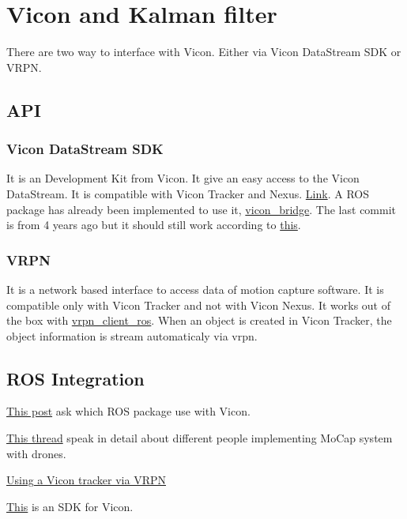 \section{Vicon and Kalman filter}
There are two way to interface with Vicon. Either via Vicon DataStream SDK or VRPN.

\subsection{API}
\subsubsection{Vicon DataStream SDK}
It is an Development Kit from Vicon. It give an easy access to the Vicon DataStream. It is compatible with Vicon Tracker and Nexus. \href{https://www.vicon.com/downloads/utilities-and-sdk/datastream-sdk}{Link}. A ROS package has already been implemented to use it, \href{https://github.com/ethz-asl/vicon_bridge}{vicon\_bridge}.
The last commit is from 4 years ago but it should still work according to \href{https://answers.ros.org/question/329849/which-ros-package-use-with-vicon/}{this}.

\subsubsection{VRPN}
It is a network based interface to access data of motion capture software. It is compatible only with Vicon Tracker and not with Vicon Nexus. It works out of the box with \href{https://wiki.ros.org/vrpn_client_ros}{vrpn\_client\_ros}. When an object is created in Vicon Tracker, the object information is stream automaticaly via vrpn.

\subsection{ROS Integration}
\href{https://answers.ros.org/question/329849/which-ros-package-use-with-vicon/}{This post} ask which ROS package use with Vicon.

\href{https://discuss.ardupilot.org/t/position-hold-with-vision-position-estimate-and-att-pos-mocap-for-indoor-localization/29626/5}{This thread} speak in detail about different people implementing MoCap system with drones.

\href{https://support.middlevr.com/hc/en-us/articles/203900225-Using-a-Vicon-tracker-via-VRPN}{Using a Vicon tracker via VRPN}

\href{https://www.vicon.com/downloads/utilities-and-sdk/datastream-sdk}{This} is an SDK for Vicon.

